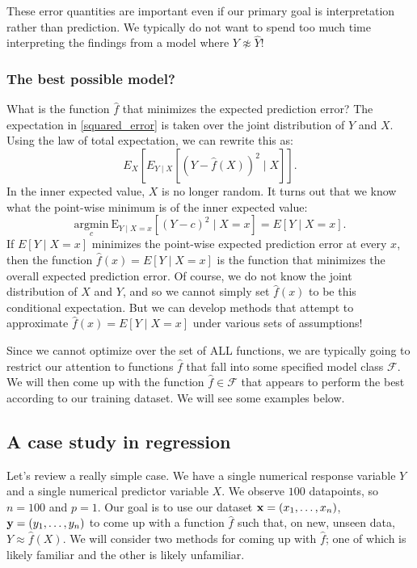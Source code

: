 \documentclass[titlepage,10pt]{scrartcl}
\begin{document}
These error quantities are important even if our primary goal is interpretation rather than prediction. We typically do not want to spend too much time interpreting the findings from a model where $Y \not\approx \hat{Y}$! 

\subsubsection{The best possible model?}

What is the function $\hat{f}$ that minimizes the expected prediction error? The expectation in \eqref{squared_error} is taken over the joint distribution of $Y$ and $X$. Using the law of total expectation, we can rewrite this as: 
$$
E_{X} \left[ E_{Y \mid X} \left[ (Y - \hat{f}(X))^2 \mid X \right] \right].
$$
In the inner expected value, $X$ is no longer random. It turns out that we know what the point-wise minimum is of the inner expected value: 
$$
\underset{c}{\mathrm{argmin}} \  \mathrm{E}_{Y \mid X=x} \left[ (Y - c)^2 \mid X=x \right] = E[Y \mid X=x]. 
$$
If $E[Y \mid X=x]$ minimizes the point-wise expected prediction error at every $x$, then the function $\hat{f}(x) = E[Y \mid X=x]$ is the function that minimizes the overall expected prediction error. Of course, we do not know the joint distribution of $X$ and $Y$, and so we cannot simply set $\hat{f}(x)$ to be this conditional expectation. But we can develop methods that attempt to approximate $\hat{f}(x) = E[Y \mid X=x]$ under various sets of assumptions!

Since we cannot optimize over the set of ALL functions, we are typically going to restrict our attention to functions $\hat{f}$ that fall into some specified model class $\mathcal{F}$.  We will then come up with the function $\hat{f} \in \mathcal{F}$ that appears to perform the best according to our training dataset. We will see some examples below.



\subsection{A case study in regression}

Let's review a really simple case. We have a single numerical response variable $Y$ and a single numerical predictor variable $X$. We observe $100$ datapoints, so $n=100$ and $p=1$. Our goal is to use our dataset $\bold{x} = (x_1, \ldots, x_n)$, $\bold{y} = (y_1,\ldots,y_n)$ to come up with a function $\hat{f}$ such that, on new, unseen data, $Y \approx \hat{f}(X)$. We will consider two methods for coming up with $\hat{f}$; one of which is likely familiar and the other is likely unfamiliar. 
\end{document}
